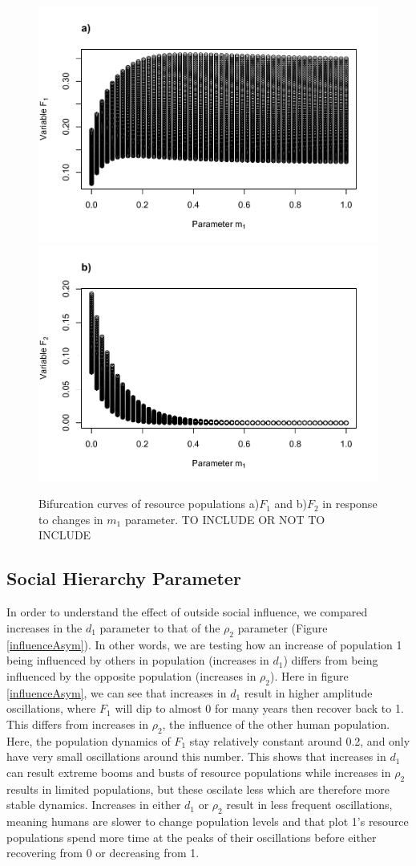 \documentclass[
  12pt,
]{article}
\begin{document}
\begin{figure}
\includegraphics[width=0.5\linewidth]{Wulfing_CH2_Draft4_files/figure-latex/mBifCurve-1} \includegraphics[width=0.5\linewidth]{Wulfing_CH2_Draft4_files/figure-latex/mBifCurve-2} \caption{Bifurcation curves of resource populations a)\(F_1\) and b)\(F_2\) in response to changes in \(m_1\) parameter. TO INCLUDE OR NOT TO INCLUDE \label{mBifCurve}}\label{fig:mBifCurve}
\end{figure}

\hypertarget{social-hierarchy-parameter}{%
\subsection{Social Hierarchy Parameter}\label{social-hierarchy-parameter}}

In order to understand the effect of outside social influence, we compared increases in the \(d_1\) parameter to that of the \(\rho_2\) parameter (Figure \ref{influenceAsym}). In other words, we are testing how an increase of population 1 being influenced by others in population (increases in \(d_1\)) differs from being influenced by the opposite population (increases in \(\rho_2\)). Here in figure \ref{influenceAsym}, we can see that increases in \(d_1\) result in higher amplitude oscillations, where \(F_1\) will dip to almost 0 for many years then recover back to 1. This differs from increases in \(\rho_2\), the influence of the other human population. Here, the population dynamics of \(F_1\) stay relatively constant around 0.2, and only have very small oscillations around this number. This shows that increases in \(d_1\) can result extreme booms and busts of resource populations while increases in \(\rho_2\) results in limited populations, but these oscilate less which are therefore more stable dynamics. Increases in either \(d_1\) or \(\rho_2\) result in less frequent oscillations, meaning humans are slower to change population levels and that plot 1's resource populations spend more time at the peaks of their oscillations before either recovering from 0 or decreasing from 1.
\end{document}
